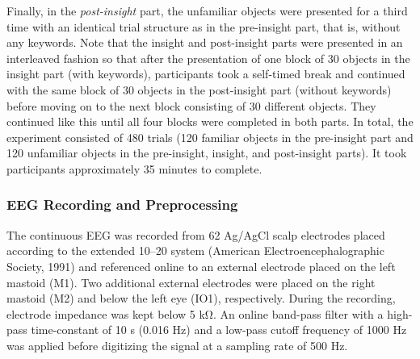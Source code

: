 \documentclass[
  english,
  doc,12pt,twoside,floatsintext]{apa7}
\begin{document}
Finally, in the \emph{post-insight} part, the unfamiliar objects were presented for a third time with an identical trial structure as in the pre-insight part, that is, without any keywords. Note that the insight and post-insight parts were presented in an interleaved fashion so that after the presentation of one block of 30 objects in the insight part (with keywords), participants took a self-timed break and continued with the same block of 30 objects in the post-insight part (without keywords) before moving on to the next block consisting of 30 different objects. They continued like this until all four blocks were completed in both parts. In total, the experiment consisted of 480 trials (120 familiar objects in the pre-insight part and 120 unfamiliar objects in the pre-insight, insight, and post-insight parts). It took participants approximately 35 minutes to complete.

\hypertarget{eeg-recording-and-preprocessing}{%
\subsubsection{EEG Recording and Preprocessing}\label{eeg-recording-and-preprocessing}}

The continuous EEG was recorded from 62 Ag/AgCl scalp electrodes placed according to the extended 10--20 system (American Electroencephalographic Society, 1991) and referenced online to an external electrode placed on the left mastoid (M1). Two additional external electrodes were placed on the right mastoid (M2) and below the left eye (IO1), respectively. During the recording, electrode impedance was kept below 5 kΩ. An online band-pass filter with a high-pass time-constant of 10 s (0.016 Hz) and a low-pass cutoff frequency of 1000 Hz was applied before digitizing the signal at a sampling rate of 500 Hz.
\end{document}

